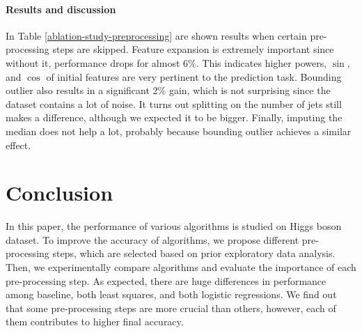 \paragraph{Results and discussion}
In Table \ref{ablation-study-preprocessing} are shown results when certain pre-processing steps are skipped. Feature expansion is extremely important since without it, performance drops for almost $6\%$. This indicates higher powers, $\sin$, and $\cos$ of initial features are very pertinent to the prediction task. Bounding outlier also results in a significant $2\%$ gain, which is not surprising since the dataset contains a lot of noise. It turns out splitting on the number of jets still makes a difference, although we expected it to be bigger. Finally, imputing the median does not help a lot, probably because bounding outlier achieves a similar effect.
\section{Conclusion}
\label{conclusion}

In this paper, the performance of various algorithms is studied on Higgs boson dataset. To improve the accuracy of algorithms, we propose different pre-processing steps, which are selected based on prior exploratory data analysis. Then, we experimentally compare algorithms and evaluate the importance of each pre-processing step. As expected, there are huge differences in performance among baseline, both least squares, and both logistic regressions. We find out that some pre-processing steps are more crucial than others, however, each of them contributes to higher final accuracy.


